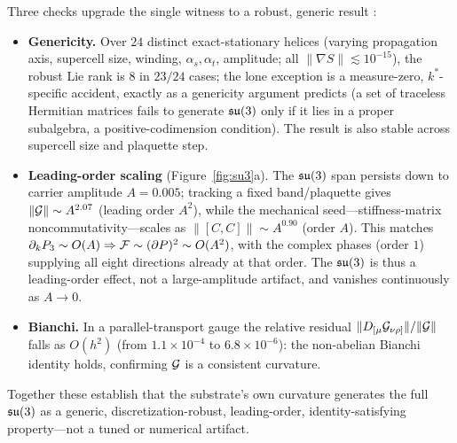 Three checks upgrade the single witness to a robust, generic result \citep{repo}:
\begin{itemize}
  \item \textbf{Genericity.} Over $24$ distinct exact-stationary helices (varying propagation
  axis, supercell size, winding, $\alpha_s,\alpha_t$, amplitude; all $\|\nabla S\|\lesssim10^{-15}$),
  the robust Lie rank is $8$ in $23/24$ cases; the lone exception is a
  measure-zero, $k^\ast$-specific accident, exactly as a genericity argument predicts (a set of traceless
  Hermitian matrices fails to generate $\mathfrak{su}(3)$ only if it lies in a proper subalgebra, a
  positive-codimension condition). The result is also stable across supercell size and
  plaquette step.
  \item \textbf{Leading-order scaling} (Figure~\ref{fig:su3}a). The $\mathfrak{su}(3)$ span persists down to
  carrier amplitude $A=0.005$; tracking a fixed band/plaquette gives $\|\mathcal{G}\|\sim A^{2.07}$ (leading order $A^2$),
  while the mechanical seed---stiffness-matrix noncommutativity---scales as
  $\|[C,C]\|\sim A^{0.90}$ (order $A$). This matches $\partial_k P_3\sim O(A)\Rightarrow
  \mathcal{F}\sim(\partial P)^2\sim O(A^2)$, with the complex phases (order $1$) supplying all eight
  directions already at that order. The $\mathfrak{su}(3)$ is thus a leading-order effect, not a
  large-amplitude artifact, and vanishes continuously as $A\to 0$.
  \item \textbf{Bianchi.} In a parallel-transport gauge the relative residual
  $\|D_{[\mu}\mathcal{G}_{\nu\rho]}\|/\|\mathcal{G}\|$ falls as $O(h^2)$ (from $1.1\times10^{-4}$ to
  $6.8\times10^{-6}$): the non-abelian Bianchi identity holds, confirming $\mathcal{G}$ is a consistent
  curvature.
\end{itemize}
Together these establish that the substrate's own curvature generates the full $\mathfrak{su}(3)$ as a
generic, discretization-robust, leading-order, identity-satisfying property---not a tuned or
numerical artifact.
